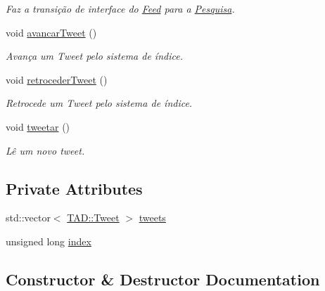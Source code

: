 \begin{DoxyCompactItemize}
\begin{DoxyCompactList}\small\item\em Faz a transição de interface do \hyperlink{class_interface_1_1_feed}{Feed} para a \hyperlink{class_interface_1_1_pesquisa}{Pesquisa}. \end{DoxyCompactList}\item 
void \hyperlink{class_interface_1_1_feed_a2203568fb299f7ea19040e9770eb16a3}{avancar\+Tweet} ()
\begin{DoxyCompactList}\small\item\em Avança um Tweet pelo sistema de índice. \end{DoxyCompactList}\item 
void \hyperlink{class_interface_1_1_feed_aace561e639f20dbb5eb0b6662a4a637e}{retroceder\+Tweet} ()
\begin{DoxyCompactList}\small\item\em Retrocede um Tweet pelo sistema de índice. \end{DoxyCompactList}\item 
void \hyperlink{class_interface_1_1_feed_a38ef9424e64953f3f526df972f3452a7}{tweetar} ()
\begin{DoxyCompactList}\small\item\em Lê um novo tweet. \end{DoxyCompactList}\end{DoxyCompactItemize}
\subsection*{Private Attributes}
\begin{DoxyCompactItemize}
\item 
std\+::vector$<$ \hyperlink{class_t_a_d_1_1_tweet}{T\+A\+D\+::\+Tweet} $>$ \hyperlink{class_interface_1_1_feed_a50d506d437402c19a1b1b8319639b7cf}{tweets}
\item 
unsigned long \hyperlink{class_interface_1_1_feed_ac9bb88831516af18069557d6e3d8c03c}{index}
\end{DoxyCompactItemize}


\subsection{Constructor \& Destructor Documentation}
\mbox{\label{class_interface_1_1_feed_a03aed37bb58912363b04bb319d16d8b8}} 

